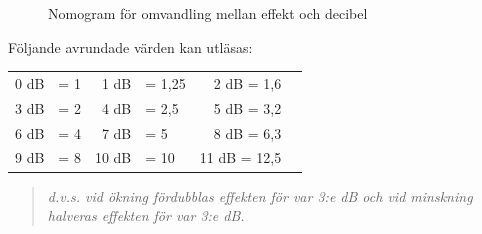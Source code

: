 \begin{figure}
  \caption{Nomogram för omvandling mellan effekt och decibel}
  \label{ellära-nomogram-db-effekt}
\end{figure}

Följande avrundade värden kan utläsas:

\begin{tabular}{rlrlrl}
0 dB & = 1 &  1 dB & =  1,25 & 2 dB = 1,6 \\
3 dB & = 2 &  4 dB & =  2,5  & 5 dB = 3,2 \\
6 dB & = 4 &  7 dB & =  5    & 8 dB = 6,3 \\
9 dB & = 8 & 10 dB & = 10    & 11 dB = 12,5
\end{tabular}

\begin{quote}\emph{
d.v.s. vid ökning fördubblas effekten för var 3:e dB och vid minskning
halveras effekten för var 3:e dB.
}\end{quote}

